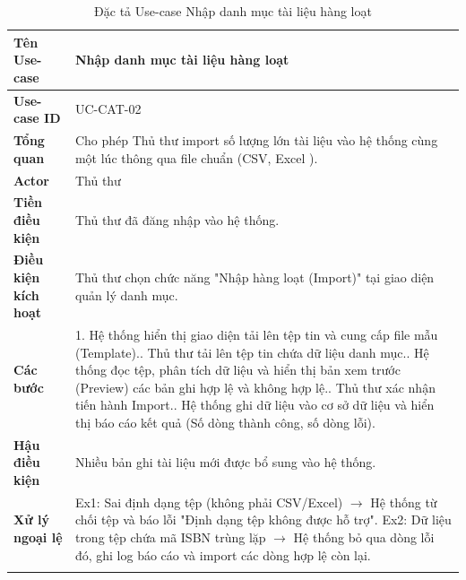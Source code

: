 \newpage
\begin{longtable}{|p{3.5cm}|p{11.5cm}|}
    \hline
    \textbf{Tên Use-case} & \textbf{Nhập danh mục tài liệu hàng loạt} \\
    \hline
    \textbf{Use-case ID} & UC-CAT-02 \\
    \hline
    \textbf{Tổng quan} & Cho phép Thủ thư import số lượng lớn tài liệu vào hệ thống cùng một lúc thông qua file chuẩn (CSV, Excel ). \\
    \hline
    \textbf{Actor} & Thủ thư \\
    \hline
    \textbf{Tiền điều kiện} & Thủ thư đã đăng nhập vào hệ thống. \\
    \hline
    \textbf{Điều kiện kích hoạt} & Thủ thư chọn chức năng "Nhập hàng loạt (Import)" tại giao diện quản lý danh mục. \\
    \hline
    \textbf{Các bước} & 
    1. Hệ thống hiển thị giao diện tải lên tệp tin và cung cấp file mẫu (Template).\newline
    2. Thủ thư tải lên tệp tin chứa dữ liệu danh mục.\newline
    3. Hệ thống đọc tệp, phân tích dữ liệu và hiển thị bản xem trước (Preview) các bản ghi hợp lệ và không hợp lệ.\newline
    4. Thủ thư xác nhận tiến hành Import.\newline
    5. Hệ thống ghi dữ liệu vào cơ sở dữ liệu và hiển thị báo cáo kết quả (Số dòng thành công, số dòng lỗi). \\
    \hline
    \textbf{Hậu điều kiện} & Nhiều bản ghi tài liệu mới được bổ sung vào hệ thống. \\
    \hline
    \textbf{Xử lý ngoại lệ} & 
    Ex1: Sai định dạng tệp (không phải CSV/Excel) $\rightarrow$ Hệ thống từ chối tệp và báo lỗi "Định dạng tệp không được hỗ trợ".\newline
    Ex2: Dữ liệu trong tệp chứa mã ISBN trùng lặp $\rightarrow$ Hệ thống bỏ qua dòng lỗi đó, ghi log báo cáo và import các dòng hợp lệ còn lại. \\
    \hline
    \caption{Đặc tả Use-case Nhập danh mục tài liệu hàng loạt}
\end{longtable}

